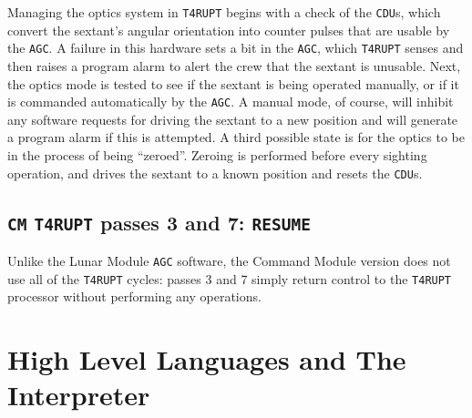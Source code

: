 \documentclass[refcap, oxford]{ahsan}
\begin{document}
Managing the optics system in \texttt{T4RUPT} begins with a check of the \texttt{CDU}s, which convert the sextant's angular orientation into counter pulses that are usable by the \texttt{AGC}. A failure in this hardware sets a bit in the \texttt{AGC}, which \texttt{T4RUPT} senses and then raises a program alarm to alert the crew that the sextant is unusable. Next, the optics mode is tested to see if the sextant is being operated manually, or if it is commanded automatically by the \texttt{AGC}. A manual mode, of course, will inhibit any software requests for driving the sextant to a new position and will generate a program alarm if this is attempted. A third possible state is for the optics to be in the process of being ``zeroed''. Zeroing is performed before every sighting operation, and drives the sextant to a known position and resets the \texttt{CDU}s.


\subsection{\texttt{CM} \texttt{T4RUPT} passes 3 and 7: \texttt{RESUME}}
Unlike the Lunar Module \texttt{AGC} software, the Command Module version does not use all of the \texttt{T4RUPT} cycles: passes 3 and 7 simply return control to the \texttt{T4RUPT} processor without performing any operations.



\section{High Level Languages and The Interpreter}
\end{document}
